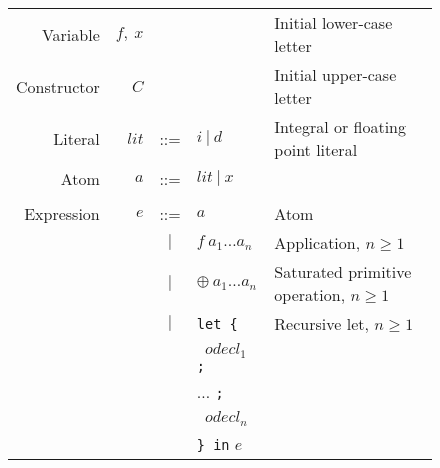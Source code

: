 \documentclass{llncs}
\begin{document}
\setlength{\tabcolsep}{5pt}
\begin{figure}
\centering
\footnotesize %
\begin{tabular}{r r c l l}
Variable     & $f,\ x$        &     &                                              & Initial lower-case letter \\
Constructor  & $C$            &     &                                              & Initial upper-case letter \\
Literal      & $\mathit{lit}$ & ::= & $i\ |\ d$                                    & Integral or floating point literal \\
Atom         & $a$            & ::= & $\mathit{lit}\ |\ x$                         & \\ %
\\
Expression   & $e$            & ::= & $a$                                          & Atom \\
             &                & $|$ & $f\ a_1\dots a_n$                            & Application, $n\ge 1$ \\
             &                & $|$ & $\oplus\ a_1\dots a_n$                       & Saturated primitive operation, $n\ge 1$ \\

             &                & $|$ & \texttt{let \{}                              & Recursive let, $n\ge 1$ \\
             &                &     & \texttt{ } $\mathit{odecl}_1$ \texttt{;} \\
             &                &     & \hspace{0.2in} $\dots$ \texttt{;} \\
             &                &     & \texttt{ } $\mathit{odecl}_n$ \\
             &                &     & \texttt{\} in} $e$  \\


\end{tabular}
\end{figure}
\end{document}
